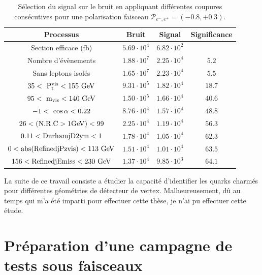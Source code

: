    \begin{table}
    \begin{tabular}{c c c c}
      \hline
      Processus                                     & Bruit        & Signal              & Significance  \tabularnewline
      \hline
      \hline
      Section efficace (fb)                          & $5.69 \cdot 10^{4}$ & $6.82 \cdot 10^{2}$ &               \tabularnewline
      Nombre d'évènements                       & $1.88 \cdot 10^{7}$ & $2.25 \cdot 10^{4}$ & $5.2$         \tabularnewline
      Sans leptons isolés                         & $1.65 \cdot 10^{7}$ & $2.23 \cdot 10^{4}$ & $5.5$         \tabularnewline
      {$35 <~\rm{{P}_{t}^{vis}} < 155~\rm{GeV} $} & $9.31 \cdot 10^{5}$ & $1.82 \cdot 10^{4}$ & $18.7$        \tabularnewline
      {$95 <~\rm{m_{vis}}< 140~\rm{GeV}$}         & $1.50 \cdot 10^{5}$ & $1.66 \cdot 10^{4}$ & $40.6$        \tabularnewline
      {$-1 <~\rm{\cos{\alpha}}< 0.22$}            & $8.76 \cdot 10^{4}$ & $1.57 \cdot 10^{4}$ & $48.8$        \tabularnewline
      $26 < (\rm{N.R.C > 1GeV}) < 99$                    & $2.25 \cdot 10^{4}$ & $1.19 \cdot 10^{4}$ & $56.3$        \tabularnewline
      $0.11 < \rm{DurhamjD2ym} < 1$               & $1.78 \cdot 10^{4}$ & $1.05 \cdot 10^{4}$ & $62.3$        \tabularnewline
      $0 < \rm{abs(RefinedjPzvis)} < 113~\rm{GeV}$& $1.51 \cdot 10^{4}$ & $1.01 \cdot 10^{4}$ & $63.5$        \tabularnewline
      $156 < \rm{RefinedjEmiss} < 230~\rm{GeV}$   & $1.37 \cdot 10^{4}$ & $9.85 \cdot 10^{3}$ & $64.1$        \tabularnewline      
    \end{tabular}
    \caption{Sélection du signal sur le bruit en appliquant différentes coupures consécutives pour une polarisation faisceau $\mathcal{P}_{e^{-},e^{+}} = (-0.8, +0.3)$.}
    \label{tab:cutFlow}
  \end{table}



  La suite de ce travail consiste a étudier la capacité d'identifier les quarks charmés pour différentes géométries de détecteur de vertex. 
  Malheureusement, dû au temps qui m'a été imparti pour effectuer cette thèse, je n'ai pu effectuer cette étude.

  \section{Préparation d'une campagne de tests sous faisceaux}

